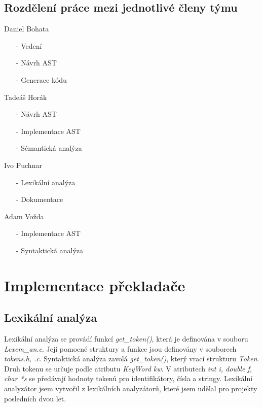\documentclass[a4paper, 12pt]{article}
\begin{document}
\subsection{Rozdělení práce mezi jednotlivé členy týmu}
\begin{itemize}
    \begin{minipage}{0.5\linewidth}   
        \item Daniel Bohata
        \begin{itemize}
        \item[-] Vedení
        \item[-] Návrh AST
        \item[-] Generace kódu 
        \end{itemize}
        \item Tadeáš Horák
        \begin{itemize}
        \item[-] Návrh AST
        \item[-] Implementace AST
        \item[-] Sémantická analýza
        \end{itemize}
        \item Ivo Puchnar
        \begin{itemize}
        \item[-] Lexikální analýza
        \item[-] Dokumentace
        \end{itemize}
        \item Adam Vožda
        \begin{itemize}
        \item[-] Implementace AST
        \item[-] Syntaktická analýza
        \end{itemize}
    \end{minipage}
\end{itemize}

\newpage
{}
\section{Implementace překladače}
\subsection{Lexikální analýza}
Lexikální analýza se provádí funkcí \textit{get\_token()}, která je definována v souboru \textit{Lexem\_an.c}. Její pomocné struktury a funkce jsou definovány v souborech \textit{tokens.h, .c}.\newline
Syntaktická analýza zavolá \textit{get\_token()}, který vrací strukturu \textit{Token}. Druh tokenu se určuje podle atributu \textit{KeyWord kw}. V atributech \textit{int i, double f, char *s} se předávají hodnoty tokenů pro identifikátory, čísla a stringy.\newline
Lexikální analyzátor jsem vytvořil z lexikálních analyzátorů, které jsem udělal pro projekty posledních dvou let.
\end{document}
